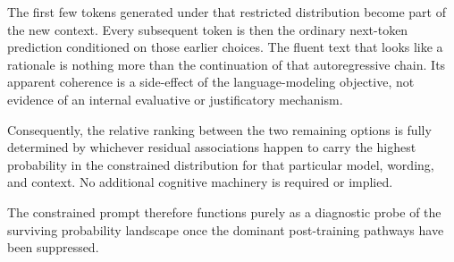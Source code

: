 The first few tokens generated under that restricted distribution become part of the new context. Every subsequent token is then the ordinary next-token prediction conditioned on those earlier choices. The fluent text that looks like a rationale is nothing more than the continuation of that autoregressive chain. Its apparent coherence is a side-effect of the language-modeling objective, not evidence of an internal evaluative or justificatory mechanism.

Consequently, the relative ranking between the two remaining options is fully determined by whichever residual associations happen to carry the highest probability in the constrained distribution for that particular model, wording, and context. No additional cognitive machinery is required or implied.

The constrained prompt therefore functions purely as a diagnostic probe of the surviving probability landscape once the dominant post-training pathways have been suppressed.


